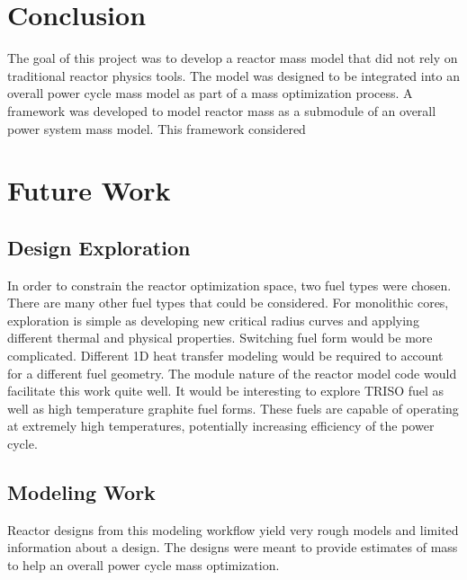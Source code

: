 \section{Conclusion}
The goal of this project was to develop a reactor mass model that did not rely
on traditional reactor physics tools. The model was designed to be integrated
into an overall power cycle mass model as part of a mass optimization process. A
framework was developed to model reactor mass as a submodule of an overall
power system mass model. This framework considered 

\section{Future Work}

\subsection{Design Exploration}
In order to constrain the reactor optimization space, two fuel types were
chosen. There are many other fuel types that could be considered. For monolithic
cores, exploration is simple as developing new critical radius curves and
applying different thermal and physical properties. Switching fuel form would be
more complicated. Different 1D heat transfer modeling would be required to
account for a different fuel geometry. The module nature of the reactor model
code would facilitate this work quite well. It would be interesting to explore
TRISO fuel as well as high temperature graphite fuel forms. These fuels are
capable of operating at extremely high temperatures, potentially increasing
efficiency of the power cycle.

\subsection{Modeling Work}
Reactor designs from this modeling workflow yield very rough models and limited
information about a design. The designs were meant to provide estimates of mass
to help an overall power cycle mass optimization. 

